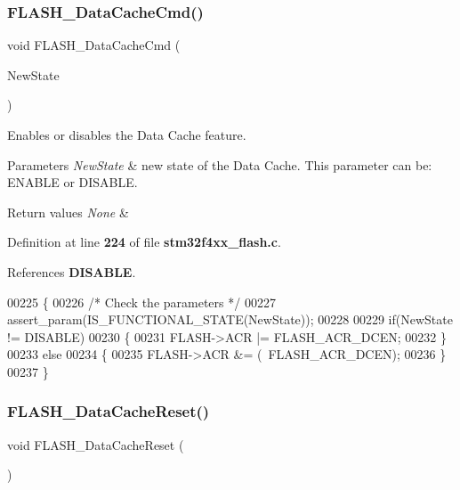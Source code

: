 \subsubsection{F\+L\+A\+S\+H\+\_\+\+Data\+Cache\+Cmd()}
{\footnotesize\ttfamily void F\+L\+A\+S\+H\+\_\+\+Data\+Cache\+Cmd (\begin{DoxyParamCaption}\item[{\textbf{ Functional\+State}}]{New\+State }\end{DoxyParamCaption})}



Enables or disables the Data Cache feature. 


\begin{DoxyParams}{Parameters}
{\em New\+State} & new state of the Data Cache. This parameter can be\+: E\+N\+A\+B\+LE or D\+I\+S\+A\+B\+LE. \\
\hline
\end{DoxyParams}

\begin{DoxyRetVals}{Return values}
{\em None} & \\
\hline
\end{DoxyRetVals}


Definition at line \textbf{ 224} of file \textbf{ stm32f4xx\+\_\+flash.\+c}.



References \textbf{ D\+I\+S\+A\+B\+LE}.


\begin{DoxyCode}
00225 \{
00226   \textcolor{comment}{/* Check the parameters */}
00227   assert_param(IS_FUNCTIONAL_STATE(NewState));
00228   
00229   \textcolor{keywordflow}{if}(NewState != DISABLE)
00230   \{
00231     FLASH->ACR |= FLASH_ACR_DCEN;
00232   \}
00233   \textcolor{keywordflow}{else}
00234   \{
00235     FLASH->ACR &= (~FLASH_ACR_DCEN);
00236   \}
00237 \}
\end{DoxyCode}
\mbox{\label{group__FLASH_ga8332da89b072373b7f116e0b7c137a22}} 
\subsubsection{F\+L\+A\+S\+H\+\_\+\+Data\+Cache\+Reset()}
{\footnotesize\ttfamily void F\+L\+A\+S\+H\+\_\+\+Data\+Cache\+Reset (\begin{DoxyParamCaption}\item[{void}]{ }\end{DoxyParamCaption})}



